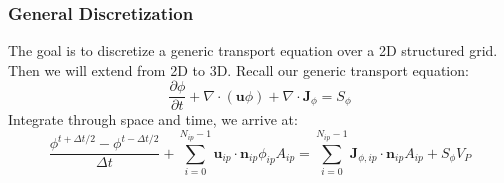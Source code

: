\documentclass[11pt]{article}
\begin{document}
\subsubsection{General Discretization}
\label{sec:orgd06cdae}
The goal is to discretize a generic transport equation over a 2D structured grid. Then we will extend
from 2D to 3D. Recall our generic transport equation:
\begin{equation*}
\frac{\partial \phi}{\partial t} + \nabla \cdot (\textbf{u}\phi) +
\nabla \cdot \textbf{J}_{\phi} = S_{\phi}
\end{equation*}
Integrate through space and time, we arrive at:
\begin{equation*}
\frac{\phi^{t+\Delta t / 2} - \phi^{t-\Delta t / 2}}{\Delta t}
+ \sum_{i=0}^{N_{ip}-1} \textbf{u}_{ip}\cdot \textbf{n}_{ip}\phi_{ip}A_{ip}
= \sum_{i=0}^{N_{ip}-1}\textbf{J}_{\phi,ip}\cdot \textbf{n}_{ip}A_{ip} + S_{\phi}V_P 
\end{equation*}
\end{document}
